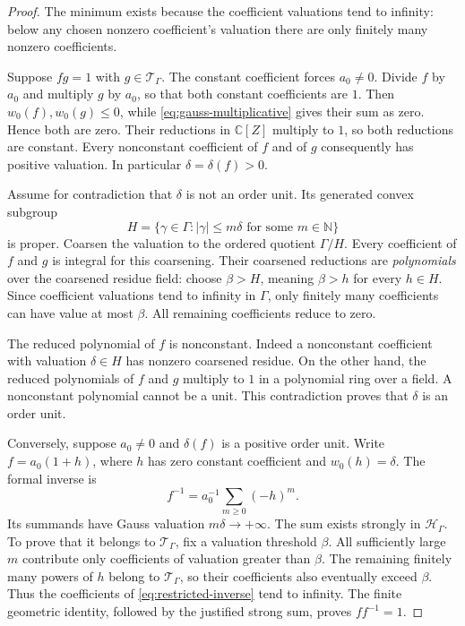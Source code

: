 \documentclass[11pt,letterpaper]{article}
\numberwithin{equation}{section}
\theoremstyle{definition}
\theoremstyle{remark}
\newcommand{\C}{\mathbb C}
\newcommand{\N}{\mathbb N}
\begin{document}
\begin{proof}
The minimum exists because the coefficient valuations tend to infinity: below
any chosen nonzero coefficient's valuation there are only finitely many
nonzero coefficients.

Suppose $fg=1$ with $g\in\mathcal T_\Gamma$. The constant coefficient forces
$a_0\ne0$. Divide $f$ by $a_0$ and multiply $g$ by $a_0$, so that both
constant coefficients are $1$. Then $w_0(f),w_0(g)\le0$, while
\eqref{eq:gauss-multiplicative} gives their sum as zero. Hence both are zero.
Their reductions in $\C[Z]$ multiply to $1$, so both reductions are constant.
Every nonconstant coefficient of $f$ and of $g$ consequently has positive
valuation. In particular $\delta=\delta(f)>0$.

Assume for contradiction that $\delta$ is not an order unit. Its generated
convex subgroup
\begin{equation}\label{eq:Hdelta}
 H=\{\gamma\in\Gamma:|\gamma|\le m\delta
                       \text{ for some }m\in\N\}
\end{equation}
is proper. Coarsen the valuation to the ordered quotient $\Gamma/H$.
Every coefficient of $f$ and $g$ is integral for this coarsening. Their
coarsened reductions are \emph{polynomials} over the coarsened residue field:
choose $\beta>H$, meaning $\beta>h$ for every $h\in H$. Since coefficient
valuations tend to infinity in $\Gamma$, only finitely many coefficients
can have value at most $\beta$. All remaining coefficients reduce to zero.

The reduced polynomial of $f$ is nonconstant. Indeed a nonconstant coefficient
with valuation $\delta\in H$ has nonzero coarsened residue. On the other hand,
the reduced polynomials of $f$ and $g$ multiply to $1$ in a polynomial ring
over a field. A nonconstant polynomial cannot be a unit. This contradiction
proves that $\delta$ is an order unit.

Conversely, suppose $a_0\ne0$ and $\delta(f)$ is a positive order unit. Write
$f=a_0(1+h)$, where $h$ has zero constant coefficient and $w_0(h)=\delta$.
The formal inverse is
\begin{equation}\label{eq:restricted-inverse}
 f^{-1}=a_0^{-1}\sum_{m\ge0}(-h)^m.
\end{equation}
Its summands have Gauss valuation $m\delta\to+\infty$. The sum exists strongly
in $\mathcal H_\Gamma$. To prove that it belongs to $\mathcal T_\Gamma$,
fix a valuation threshold $\beta$. All sufficiently large $m$ contribute
only coefficients of valuation greater than $\beta$. The remaining finitely
many powers of $h$ belong to $\mathcal T_\Gamma$, so their coefficients
also eventually exceed $\beta$. Thus the coefficients of
\eqref{eq:restricted-inverse} tend to infinity. The finite geometric identity,
followed by the justified strong sum, proves $ff^{-1}=1$.
\end{proof}
\end{document}
